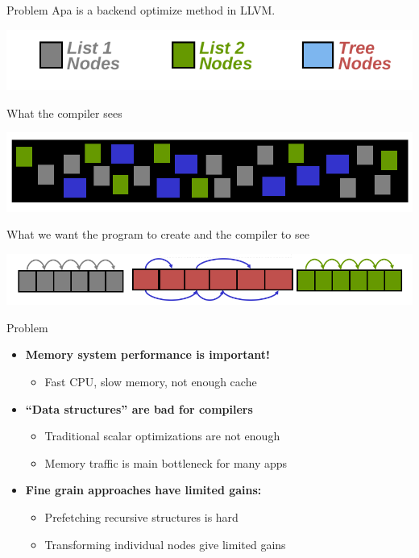 \documentclass{beamer}
\begin{document}
\begin{frame}{Problem}
  Apa is a backend optimize method in LLVM.
  \begin{center}
	\includegraphics[scale = 0.3]{./fig/1.png}
\end{center}
What the compiler sees
\begin{center}
  \includegraphics[scale = 0.3]{./fig/2.png}
\end{center}

What we want the program to create and the compiler to see
\begin{center}
  \includegraphics[scale = 0.3]{./fig/3.png}
\end{center}

\end{frame}

\begin{frame}{Problem}
  \begin{itemize}
	  \setlength{\itemsep}{0.5cm}
	\item \textbf{Memory system performance is important!}
	  \begin{itemize}
		\item Fast CPU, slow memory, not enough cache
	  \end{itemize}
	\item	\textbf{“Data structures” are bad for compilers}
	  \begin{itemize}
		\item Traditional scalar optimizations are not enough
		  \item	Memory traffic is main bottleneck for many apps
	  \end{itemize}
	\item \textbf{Fine grain approaches have limited gains:}
	  \begin{itemize}
		\item Prefetching recursive structures is hard
		  \item Transforming individual nodes give limited gains
	  \end{itemize}
  \end{itemize}
\end{frame}
\end{document}
